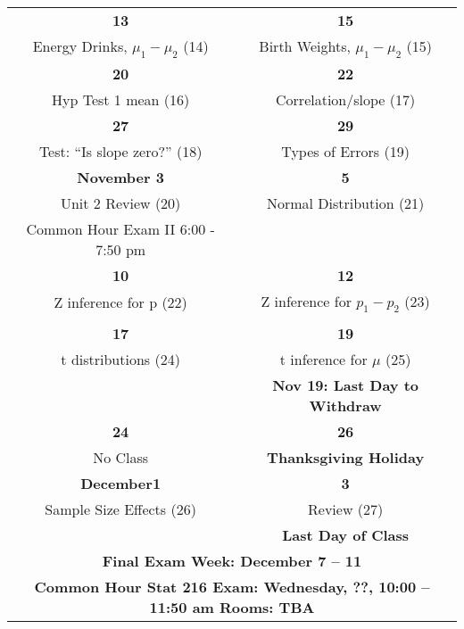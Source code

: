 \begin{center}
\begin{tabular}{|c|c|}
   \hfill\bf{13} & \hfill\bf{15} \\
 Energy Drinks, $\mu_1 - \mu_2$  \small{(14)}& 
 Birth Weights, $\mu_1 - \mu_2$ \small{(15)}  \\ 
\hline

 \hfill\bf{20}  & \hfill\bf{22} \\
Hyp Test 1 mean   \small{(16)}   &   
 Correlation/slope \small{(17)}\\ \hline

  \hfill\bf{27} & \hfill\bf{29} \\
  Test: ``Is slope zero?'' \small{(18)} &  
Types of Errors \small{(19)} %
 \\ \hline

   \bf{November} \hfill\bf{3} & \hfill\bf{5} \\
 Unit 2  Review   \small{(20)}&  
 Normal Distribution \small{(21)}  %
 \\
Common Hour Exam II 6:00 - 7:50 pm & \\
 \hline

   \hfill\bf{10} & \hfill\bf{12} \\
  Z inference for p   \small{(22)} 
 & Z inference for $p_1-p_2$  \small{(23)}
  \\
   &  \\ \hline

   \hfill\bf{17}  &  \hfill\bf{19}  \\
  t distributions  \small{(24)}&
  t inference for $\mu$  \small{(25)}\\ 
  &
   \small\bf{Nov 19: Last Day to Withdraw} \\ \hline
 
 \hfill\bf{24} & \hfill\bf{26} \\
No Class 
 & {\bf Thanksgiving Holiday} 
\\ \hline

  {\bf December}\hfill\bf{1} & \hfill\bf{3} \\
  Sample Size Effects \small{(26)}
  & Review    \small{(27)}
\\
  &  \small\bf{ Last Day of Class}  \\ \hline

  \multicolumn{2}{|c|}{\textbf{Final Exam Week: December 7 -- 11 }} \\
  \multicolumn{2}{|c|}{\bf{ Common Hour Stat 216  Exam: 
      Wednesday, ??, 10:00 -- 11:50 am Rooms: TBA}} \\
\hline

\end{tabular}
\vspace{.2in} \\
\end{center}
%  

